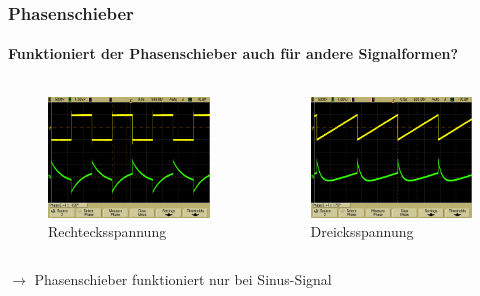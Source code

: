 \begin{frame}
\frametitle{Phasenschieber}
\framesubtitle{Funktioniert der Phasenschieber auch für andere Signalformen?}
    \begin{columns}[c]
        \begin{figure}[H]
        \begin{center}
                \includegraphics[scale=0.15]{./img/oszi/scope_10.png}
        \end{center}
        \caption{Rechtecksspannung}
        \end{figure}
        \begin{figure}[H]
        \begin{center}
                \includegraphics[scale=0.15]{./img/oszi/scope_12.png}
        \end{center}
        \caption{Dreicksspannung}
        \end{figure}
    \end{columns}
        \begin{block}{}
           $\rightarrow$ Phasenschieber funktioniert nur bei Sinus-Signal 
        \end{block}
\end{frame}



